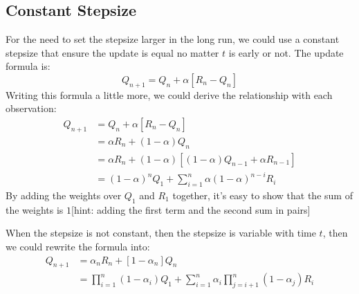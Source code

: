 \documentclass{article}
\begin{document}
\subsection{Constant Stepsize}
For the need to set the stepsize larger in the long run, we could use a constant stepsize that ensure the update is 
equal no matter $t$ is early or not. The update formula is:
$$Q_{n+1} = Q_n + \alpha[R_n - Q_n]$$
Writing this formula a little more, we could derive the relationship with each observation:
\begin{equation}
    \begin{aligned}
        Q_{n+1} &= Q_n + \alpha[R_n - Q_n]\\
                &= \alpha R_n + (1-\alpha)Q_n\\
                &= \alpha R_n + (1-\alpha)[(1-\alpha)Q_{n-1} + \alpha R_{n-1}]\\
                &= (1-\alpha)^n Q_1 + \sum_{i=1}^n \alpha(1-\alpha)^{n-i}R_i
    \end{aligned}
\end{equation}
By adding the weights over $Q_1$ and $R_1$ together, it's easy to show that the sum of the weights is $1$[hint: adding 
the first term and the second sum in pairs]

When the stepsize is not constant, then the stepsize is variable with time $t$,
then we could rewrite the formula into:
\begin{equation}
    \begin{aligned}
    Q_{n+1} &= \alpha_n R_n + [1-\alpha_n]Q_n \\
            &= \prod_{i=1}^n (1-\alpha_i)Q_{1} + \sum_{i=1}^n \alpha_i\prod_{j=i+1}^n (1-\alpha_j)R_i
    \end{aligned}    
\end{equation}
\end{document}
